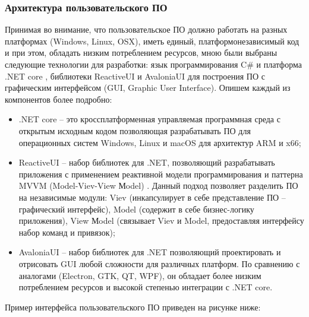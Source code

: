 \subsubsection{Архитектура пользовательского ПО}
Принимая во внимание, что пользовательское ПО должно работать на разных платформах (Windows, Linux, OSX), иметь единый, платформонезависимый код и при этом, обладать низким потреблением ресурсов, мною были выбраны следующие технологии для разработки: язык программирования C\# и платформа .NET core \cite{lib-dotnetcore}, библиотеки ReactiveUI \cite{lib-reactiveui} и AvaloniaUI \cite{lib-avaloniaui} для построения ПО с графическим интерфейсом (GUI, Graphic User Interface). Опишем каждый из компонентов более подробно:

\begin{itemize}
    \item .NET core -- это кроссплатформенная управляемая программная среда с открытым исходным кодом позволяющая разрабатывать ПО для операционных систем Windows, Linux и macOS для архитектур ARM и x66;
    \item ReactiveUI -- набор библиотек для .NET, позволяющий разрабатывать приложения с применением реактивной модели программирования и паттерна MVVM (Model-Viev-View Мodel) \cite{lib-mvvm}. Данный подход позволяет разделить ПО на независимые модули: Viev (инкапсулирует в себе представление ПО -- графический интерфейс), Model (содержит в себе бизнес-логику приложения), View Мodel (связывает Viev и Model, предоставляя интерфейсу набор команд и привязок);
    \item AvaloniaUI -- набор библиотек для .NET позволяющий проектировать и отрисовать GUI любой сложности для различных платформ. По сравнению с аналогами (Electron, GTK, QT, WPF), он обладает более низким потреблением ресурсов и высокой степенью интеграции с .NET core.
\end{itemize}

Пример интерфейса пользовательского ПО приведен на рисунке ниже:


